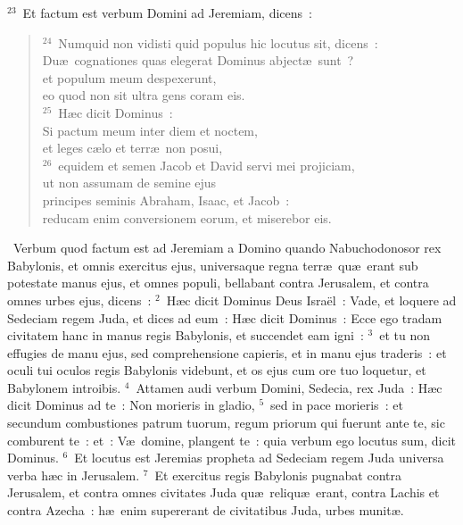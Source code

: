 ${}^{23}$~Et factum est verbum Domini ad Jeremiam, dicens~:
\begin{flushleft}\begin{verse}${}^{24}$~Numquid non vidisti quid populus hic locutus sit, dicens~:\\ Du\ae\ cognationes quas elegerat Dominus abject\ae\ sunt~?\\ et populum meum despexerunt,\\ eo quod non sit ultra gens coram eis.\\
${}^{25}$~H\ae c dicit Dominus~:\\ Si pactum meum inter diem et noctem,\\ et leges c\ae lo et terr\ae\ non posui,\\
${}^{26}$~equidem et semen Jacob et David servi mei projiciam,\\ ut non assumam de semine ejus\\ principes seminis Abraham, Isaac, et Jacob~:\\ reducam enim conversionem eorum, et miserebor eis.\end{verse}\end{flushleft}


~Verbum quod factum est ad Jeremiam a Domino quando Nabuchodonosor rex Babylonis, et omnis exercitus ejus, universaque regna terr\ae\ qu\ae\ erant sub potestate manus ejus, et omnes populi, bellabant contra Jerusalem, et contra omnes urbes ejus, dicens~:
${}^{2}$~H\ae c dicit Dominus Deus Isra\"el~: Vade, et loquere ad Sedeciam regem Juda, et dices ad eum~: H\ae c dicit Dominus~: Ecce ego tradam civitatem hanc in manus regis Babylonis, et succendet eam igni~:
${}^{3}$~et tu non effugies de manu ejus, sed comprehensione capieris, et in manu ejus traderis~: et oculi tui oculos regis Babylonis videbunt, et os ejus cum ore tuo loquetur, et Babylonem introibis.
${}^{4}$~Attamen audi verbum Domini, Sedecia, rex Juda~: H\ae c dicit Dominus ad te~: Non morieris in gladio,
${}^{5}$~sed in pace morieris~: et secundum combustiones patrum tuorum, regum priorum qui fuerunt ante te, sic comburent te~: et~: V\ae\ domine, plangent te~: quia verbum ego locutus sum, dicit Dominus.
${}^{6}$~Et locutus est Jeremias propheta ad Sedeciam regem Juda universa verba h\ae c in Jerusalem.
${}^{7}$~Et exercitus regis Babylonis pugnabat contra Jerusalem, et contra omnes civitates Juda qu\ae\ reliqu\ae\ erant, contra Lachis et contra Azecha~: h\ae\ enim supererant de civitatibus Juda, urbes munit\ae .


